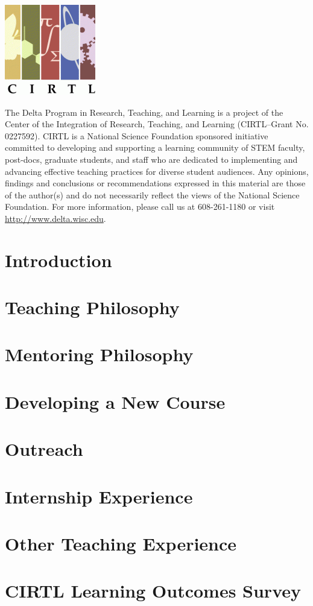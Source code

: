 \documentclass[12pt]{report} %
\begin{document}
\begin{titlepage}
\begin{center}
\includegraphics[scale=0.5]{images/cirtl.png}
\end{center}
{\tiny The Delta Program in Research, Teaching, and Learning is a project of the Center of the Integration of Research, Teaching, and Learning (CIRTL--Grant No. 0227592).  CIRTL is a National Science Foundation sponsored initiative committed to developing and supporting a learning community of STEM faculty, post-docs, graduate students, and staff who are dedicated to implementing  and advancing effective teaching practices for diverse student audiences.  Any opinions, findings and conclusions or recommendations expressed in this material are those of the author(s) and do not necessarily reflect the views of the National Science Foundation. For more information, please call us at 608-261-1180 or visit \url{http://www.delta.wisc.edu}. \par}
\end{titlepage}

\makeatletter
\let\ps@plain\ps@fancy 
\makeatother

\tableofcontents

\newpage
\chapter{Introduction}

\newpage
\chapter{Teaching Philosophy}

\newpage
\chapter{Mentoring Philosophy}

\newpage
\chapter{Developing a New Course}

\newpage
\chapter{Outreach}

\newpage
\chapter{Internship Experience}

\newpage
\chapter{Other Teaching Experience}

\newpage
\chapter{CIRTL Learning Outcomes Survey}
\end{document}
